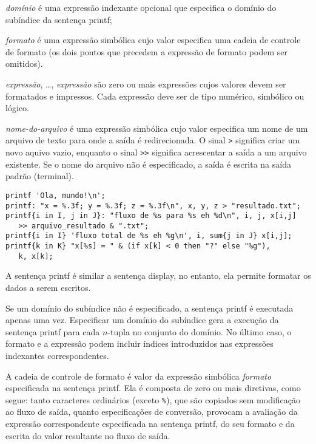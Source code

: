 \documentclass[11pt, brazil]{report}
\def\para#1{\noindent{\bf#1}}
\begin{document}
\medskip

\noindent
{\it domínio} é uma expressão indexante opcional que especifica o domínio
do subíndice da sentença printf;

\noindent
{\it formato} é uma expressão simbólica cujo valor especifica uma cadeia de
controle de formato (os dois pontos que precedem a expressão de formato
podem ser omitidos).

\noindent
{\it expressão}, \dots, {\it expressão} são zero ou mais expressões
cujos valores devem ser formatados e impressos. Cada expressão deve
ser de tipo numérico, simbólico ou lógico.

\noindent
{\it nome-do-arquivo} é uma expressão simbólica cujo valor especifica um nome
de um arquivo de texto para onde a saída é redirecionada. O sinal {\tt>}
significa criar um novo aquivo vazio, enquanto o sinal {\tt>>} significa
acrescentar a saída a um arquivo existente. Se o nome do arquivo não é especificado,
a saída é escrita na saída padrão (terminal).

\para{Exemplos}

\begin{verbatim}
printf 'Ola, mundo!\n';
printf: "x = %.3f; y = %.3f; z = %.3f\n", x, y, z > "resultado.txt";
printf{i in I, j in J}: "fluxo de %s para %s eh %d\n", i, j, x[i,j]
   >> arquivo_resultado & ".txt";
printf{i in I} 'fluxo total de %s eh %g\n', i, sum{j in J} x[i,j];
printf{k in K} "x[%s] = " & (if x[k] < 0 then "?" else "%g"),
   k, x[k];
\end{verbatim}

A sentença printf é similar a sentença display, no entanto, ela
permite formatar os dados a serem escritos.

Se um domínio do subíndice não é especificado, a sentença printf
é executada apenas uma vez. Especificar um domínio do subíndice gera
a execução da sentença printf para cada $n$-tupla no conjunto do domínio.
No último caso, o formato e a expressão podem incluir índices introduzidos
nas expressões indexantes correspondentes.

A cadeia de controle de formato é valor da expressão simbólica
{\it formato} especificada na sentença printf. Ela é composta de zero
ou mais diretivas, como segue: tanto caracteres ordinários (exceto {\tt\%}), que
são copiados sem modificação ao fluxo de saída, quanto especificações de conversão,
provocam a avaliação da expressão correspondente especificada na sentença
printf, do seu formato e da escrita do valor resultante no fluxo de saída.
\end{document}
